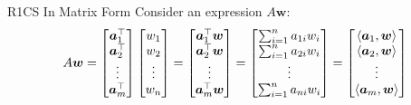 \documentclass{zkdl-presentation-template}
\begin{document}
\begin{frame}{R1CS In Matrix Form}
        Consider an expression $A\boldsymbol{w}$:
        \vspace{-5pt}
        {\scriptsize \begin{equation*}
            A\boldsymbol{w} = \begin{bmatrix}
                \boldsymbol{a}_1^{\top} \\ \boldsymbol{a}_2^{\top} \\ \vdots \\ \boldsymbol{a}_m^{\top}
            \end{bmatrix}\begin{bmatrix}
                w_1 \\ w_2 \\ \vdots \\ w_n
            \end{bmatrix} = \begin{bmatrix}
                \boldsymbol{a}_1^{\top}\boldsymbol{w} \\ \boldsymbol{a}_2^{\top}\boldsymbol{w} \\ \vdots \\ \boldsymbol{a}_m^{\top}\boldsymbol{w}
            \end{bmatrix} = \begin{bmatrix}
                \sum_{i=1}^{n}a_{1i}w_i \\ \sum_{i=1}^{n}a_{2i}w_i \\ \vdots \\ \sum_{i=1}^{n}a_{ni}w_i
            \end{bmatrix} = \begin{bmatrix}
                \langle \boldsymbol{a}_1, \boldsymbol{w}\rangle \\
                \langle \boldsymbol{a}_2, \boldsymbol{w}\rangle \\
                \vdots \\
                \langle \boldsymbol{a}_m, \boldsymbol{w}\rangle 
            \end{bmatrix}
            \vspace{-5pt}
        \end{equation*}}
        

\end{frame}
\end{document}
